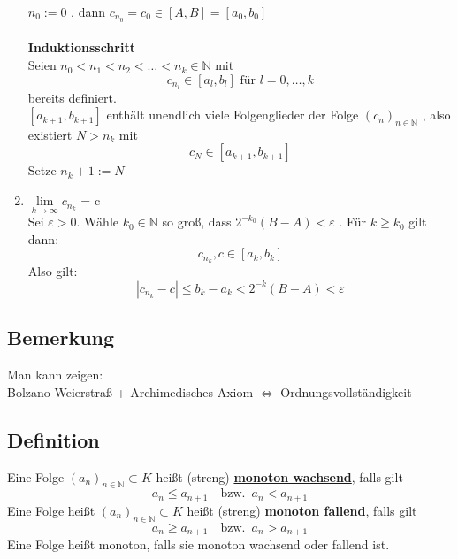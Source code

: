 \begin{enumerate}[1.]
	$n_0 := 0$ , dann $c_{n_0} = c_0 \in [A,B] = [a_0 , b_0]$ \\
	\vspace{\baselineskip} \\
	\textbf{Induktionsschritt} \\
	Seien $n_0 < n_1 < n_2 < \ldots < n_k \in \mathds{N}$ mit 
	\[
		c_{n_l} \in [a_l , b_l] \text{ für } l = 0, \ldots  , k
	\]
	bereits definiert.
	\vspace{\baselineskip} \\
	$[a_{k+1}, b_{k+1}]$ enthält unendlich viele Folgenglieder der Folge $(c_n)_{n \in \mathds{N}}$ , also existiert $N > n_k$ mit 
	\[
		c_N \in [a_{k+1}, b_{k+1}]
	\]
	Setze $n_k+1 := N$
	
	\item $\lim\limits_{k \to \infty} c_{n_k}$ = c
	\vspace{\baselineskip} \\
	Sei $\varepsilon > 0$. Wähle $k_0 \in \mathds{N}$ so groß, dass $2^{-k_0} (B-A) < \varepsilon$ .	Für $k \geq k_0$ gilt dann:
	\[
		c_{n_k}, c \in [a_k , b_k]
	\]
	Also gilt:
	\[
		|c_{n_k} -c | \leq b_k - a_k < 2^{-k}(B-A) < \varepsilon
	\]
\end{enumerate}

\subsection{Bemerkung} %
\label{sub:bemerkung}
Man kann zeigen: \\
Bolzano-Weierstraß + Archimedisches Axiom $\Leftrightarrow$ Ordnungsvollständigkeit

\subsection{Definition} %
\label{sub:definition}
Eine Folge $(a_n)_{n \in \mathds{N}} \subset K$ heißt (streng) \underline{\textbf{monoton wachsend}}, falls gilt 
\[
	a_n \leq a_{n+1} \quad \text{bzw.} \enspace a_n < a_{n+1}
\]
Eine Folge heißt $(a_n)_{n \in \mathds{N}} \subset K$ heißt (streng) \underline{\textbf{monoton fallend}}, falls gilt
\[
	a_n \geq a_{n+1} \quad  \text{bzw.} \enspace a_n > a_{n+1}
\]
Eine Folge heißt monoton, falls sie monoton wachsend oder fallend ist.

